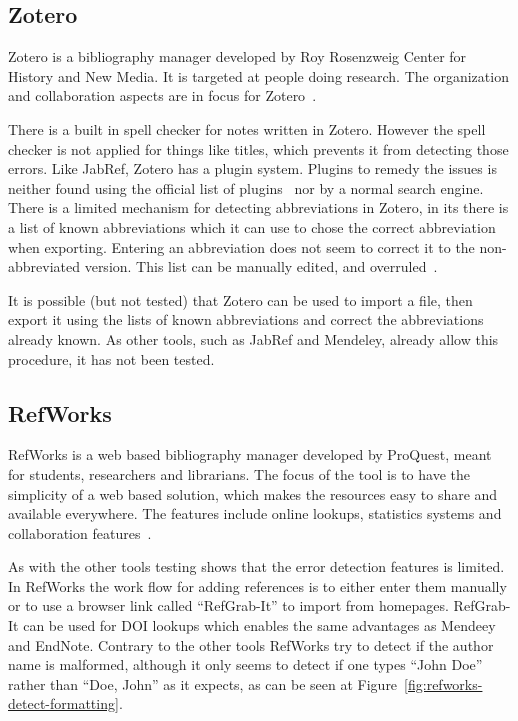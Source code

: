 \subsection{Zotero}

Zotero is a bibliography manager developed by Roy Rosenzweig Center
for History and New Media.  It is targeted at people doing research.
The organization and collaboration aspects are in focus for
Zotero~\cite{zotero_features}.

There is a built in spell checker for notes written in Zotero.
However the spell checker is not applied for things like titles, which
prevents it from detecting those errors.  Like JabRef, Zotero has a
plugin system.  Plugins to remedy the {\bibtex} issues is neither
found using the official list of plugins~\cite{zotero_plugins} nor by
a normal search engine. There is a limited mechanism for detecting
abbreviations in Zotero, in its  there is a list of known
abbreviations which it can use to chose the correct abbreviation when
exporting.  Entering an abbreviation does not seem to correct it to
the non-abbreviated version.  This list can be manually edited, and
overruled~\cite{zotero_abbreviations}.

It is possible (but not tested) that Zotero can be used to import a
{\bibtex} file, then export it using the lists of known abbreviations
and correct the abbreviations already known.  As other tools, such as
JabRef and Mendeley, already allow this procedure, it has not been
tested.


\subsection{RefWorks}
RefWorks is a web based bibliography manager developed by ProQuest,
meant for students, researchers and librarians.  The focus of the tool
is to have the simplicity of a web based solution, which makes the
resources easy to share and available everywhere.  The features
include online lookups, statistics systems and collaboration
features~\cite{refworks_features}.

As with the other tools testing shows that the error detection
features is limited.  In RefWorks the work flow for adding references
is to either enter them manually or to use a browser link called
``RefGrab-It'' to import from homepages.  RefGrab-It can be used for
DOI lookups which enables the same advantages as Mendeey and EndNote.
Contrary to the other tools RefWorks try to detect if the author name
is malformed, although it only seems to detect if one types ``John
Doe'' rather than ``Doe, John'' as it expects, as can be seen at
Figure~\ref{fig:refworks-detect-formatting}.

